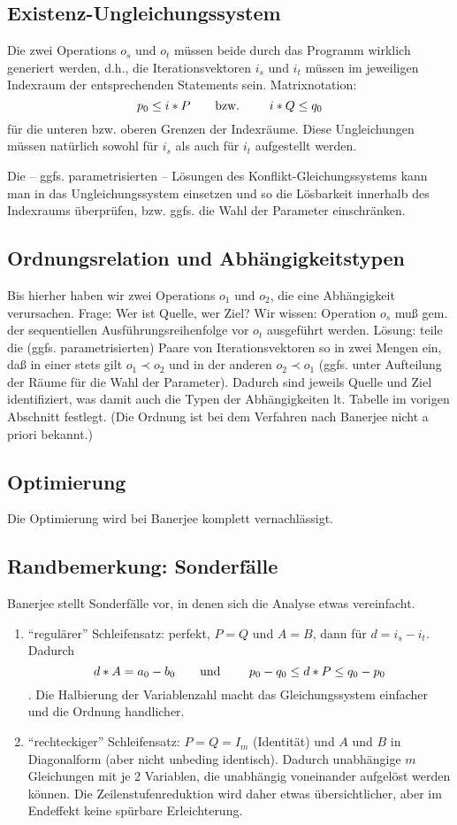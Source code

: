 \subsection{Existenz-Ungleichungssystem}
Die zwei Operations $o_s$ und $o_t$ müssen beide durch das Programm
wirklich generiert werden, d.h., die Iterationsvektoren $i_s$ und $i_t$
müssen im jeweiligen Indexraum der entsprechenden Statements
sein. Matrixnotation: $$p_0 \leq i * P \hbox{\qquad bzw. \qquad} i*Q \leq
q_0$$ für die unteren bzw. oberen Grenzen der Indexräume. Diese
Ungleichungen müssen natürlich sowohl für $i_s$ als auch für $i_t$
aufgestellt werden.

Die -- ggfs. parametrisierten -- Lösungen des Konflikt-Gleichungssystems
kann man in das Ungleichungssystem einsetzen und so die Lösbarkeit
innerhalb des Indexraums überprüfen, bzw. ggfs. die Wahl der Parameter
einschränken.


\subsection{Ordnungsrelation und Abhängigkeitstypen}
Bis hierher haben wir zwei Operations $o_1$ und $o_2$, die eine
Abhängigkeit verursachen. Frage: Wer ist Quelle, wer Ziel?  Wir wissen:
Operation $o_s$ muß gem.  der sequentiellen Ausführungsreihenfolge vor
$o_t$ ausgeführt werden. Lösung: teile die (ggfs. parametrisierten)
Paare von Iterationsvektoren so in zwei Mengen ein, daß in einer stets
gilt $o_1 \prec o_2$ und in der anderen $o_2 \prec o_1$ (ggfs. unter
Aufteilung der Räume für die Wahl der Parameter). Dadurch sind jeweils
Quelle und Ziel identifiziert, was damit auch die Typen der
Abhängigkeiten lt. Tabelle im vorigen Abschnitt festlegt. (Die Ordnung ist bei dem Verfahren nach Banerjee nicht a priori bekannt.)


\subsection{Optimierung}
Die Optimierung wird bei Banerjee komplett vernachlässigt.


\subsection{Randbemerkung: Sonderfälle}
Banerjee stellt Sonderfälle vor, in denen sich die Analyse etwas vereinfacht.
\begin{enumerate}
\item ``regulärer'' Schleifensatz: perfekt, $P=Q$ und $A=B$, dann für $d
  = i_s-i_t$. Dadurch $$ d * A = a_0-b_0 \hbox{\qquad und \qquad} p_0-q_0 \leq
  d*P \leq q_0-p_0$$. Die Halbierung der Variablenzahl macht das
  Gleichungssystem einfacher und die Ordnung handlicher.
\item ``rechteckiger'' Schleifensatz: $P=Q=I_m$ (Identität) und $A$ und
  $B$ in Diagonalform (aber nicht unbeding identisch). Dadurch
  unabhängige $m$ Gleichungen mit je 2 Variablen, die unabhängig
  voneinander aufgelöst werden können. Die Zeilenstufenreduktion wird
  daher etwas übersichtlicher, aber im Endeffekt keine spürbare
  Erleichterung.
\end{enumerate}


